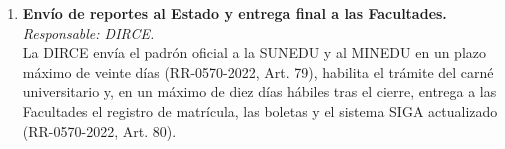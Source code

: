 \begin{enumerate}
    \item \textbf{Envío de reportes al Estado y entrega final a las Facultades.} \\
    \textit{Responsable: DIRCE.} \\
    La DIRCE envía el padrón oficial a la SUNEDU y al MINEDU en un plazo máximo de veinte días (RR-0570-2022, Art. 79\textdegree{}), habilita el trámite del carné universitario y, en un máximo de diez días hábiles tras el cierre, entrega a las Facultades el registro de matrícula, las boletas y el sistema SIGA actualizado (RR-0570-2022, Art. 80\textdegree{}).
\end{enumerate}
